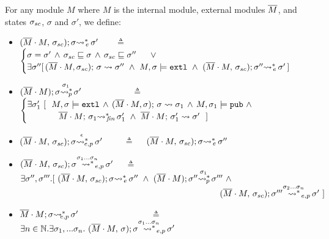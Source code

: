 \begin{definition}
For any module $M$  where $M$ is the internal module, external modules $\Mtwo$, and states $\sigma\bd$,  $\sigma$ and $\sigma'$, we define:

\begin{itemize}
\item
 ${\leadstoBoundedThreeStarExt {\Mtwo\cdot M} {\sigma\bd}  {\sigma}  {\sigma'}}$ \ \ \ $\triangleq$ \ \ 
{
$
\begin{cases}
\sigma=\sigma' \, \wedge\,  \EarlierS  {\sigma\bd}  {\sigma} \, \wedge\,  \EarlierS  {\sigma\bd}  {\sigma''}\ \ \ \ \ \vee\\
\exists \sigma''[\,  \leadstoBoundedThree {\Mtwo\cdot M} {\sigma}  {\sigma\bd}   {\sigma''} \  \wedge\  M, \sigma  \models  \extThis\  \wedge\ 
{\leadstoBoundedThreeStarExt {\Mtwo\cdot M} {\sigma\bd}  {\sigma''}  {\sigma'}}\, ]
\end{cases}
$
}
\item
${\WithPub {\Mtwo\cdot M}    {\sigma}  {\sigma'} {\sigma_1}}$ \  \ \  \ \ \ \ \ \ \ \ $\triangleq$ \ \ 
$\begin{cases}
\exists   \sigma_1'\ [ \ \   M, \sigma  \models \extThis \, \wedge \,  \leadstoBoundedThree  {\Mtwo\cdot M} {\sigma} {\sigma}  {\sigma_{1}}\, \wedge\,  M, \sigma_1 \models \pubMeth \ \wedge \\ 
\strut \ \ \ \ \  \ \ \ \ \ \   \leadstoBoundedStarFin {\Mtwo\cdot M} {\sigma_1}  {\sigma_1'}  \ \wedge \   \leadstoBounded  {\Mtwo\cdot M} {\sigma_1'}      {\sigma'} \ \ ] 
\end{cases}
$
\item
$\WithExtPub {\Mtwo\cdot M} {\sigma\bd}  {\sigma}  {\sigma'} {\epsilon}$ \ \     \ \  $\triangleq$ \ \ 
$\leadstoBoundedThreeStarExt {\Mtwo\cdot M} {\sigma\bd}  {\sigma}  {\sigma''}$
\item
$\WithExtPub {\Mtwo\cdot M} {\sigma\bd}  {\sigma}  {\sigma'} {\sigma_1...\sigma_n}$   \ \  $\triangleq$ \ \ 
$\exists \sigma'',\sigma'''.[\   {\leadstoBoundedThreeStarExt {\Mtwo\cdot M} {\sigma\bd}  {\sigma}  {\sigma''}}\ \wedge\ 
{\WithPub {\Mtwo\cdot M}    {\sigma''}  {\sigma'''} {\sigma_1}} \ \wedge$\\   
$\strut \hspace{8.2cm} {\WithExtPub {\Mtwo\cdot M} {\sigma\bd}  {\sigma'''}  {\sigma'} {\sigma_2...\sigma_n} }  \ ]$
\item
$\leadstoBoundedExtPub {\Mtwo\cdot M}    {\sigma}  {\sigma'} $   \ \ \ \ \   \ \ \  \ \ \ \   \ \ \ \  $\triangleq$   \ \ 
  $ \exists n\in \mathbb{N}. \exists \sigma_1,...\sigma_n. \ \WithExtPub {\Mtwo\cdot M} {\sigma}  {\sigma}  {\sigma'} {\sigma_1...\sigma_n} 
$
\end{itemize}
\end{definition}

